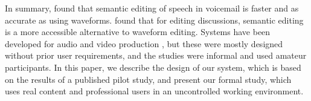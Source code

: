

In summary, \citet{Whittaker2004} found that semantic editing of speech in
voicemail is faster and as accurate as using waveforms.  \citet{Sivaraman2016}
found that for editing discussions, semantic editing is a more accessible
alternative to waveform editing. Systems have been developed for audio and
video production \citep{Casares2002,Berthouzoz2012,Rubin2013}, but these were
mostly designed without prior user requirements, and the studies were informal
and used amateur participants. In this paper, we describe the design of our
system, which is based on the results of a published pilot study, and present
our formal study, which uses real content and professional users in an
uncontrolled working environment.









